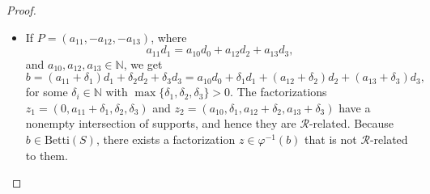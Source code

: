 \documentclass[12pt]{article}
\theoremstyle{remark}
\begin{document}
\begin{proof}
\begin{itemize}
   As $\mu_2 < a_{22}$ and $ \mu_3 < a_{33}$, we have $Q =(-\nu_1,\nu_2,\nu_3)$, where
    \begin{equation}\label{betticharacter_eq41}
        - \nu_1d_1 + \nu_2d_2 +  \nu_3d_3   =  \nu_0d_0,
    \end{equation}
    $\nu_0,\nu_2,\nu_3 \in \mathbb{Z}_{>0}$, $\nu_1 \in \mathbb{N}$ (possibly $\nu_1=0$) and $\mu_2 \geq \nu_2$, $\mu_3 \geq \nu_3$.  We can write 
    \begin{equation}\label{betticharacter_eq42}
        b =  \nu_0d_0 + \nu_1d_1 + (\mu_2-\nu_2)d_2 + (\mu_3-\nu_3)d_3.
    \end{equation}
    We have $\max \{\mu_2-\nu_2,\mu_3-\nu_3 \}>0$, as $b \notin U$, hence $z \, \mathcal{R} \, (\nu_0,\nu_1,\mu_2-\nu_2,\mu_3-\nu_3) \, \mathcal{R}  \, z_1$, which is a contradiction. 
    

    

    
    
   
    Next, suppose that $z = (0,0,\mu_2,0)$. 
    If $\mu_2 = a_{22} $, we would have $b = a_{22}d_2 \in U$, so $\mu_2 > a_{22}$. We can write
    \begin{equation}\label{betticharacter_eq6}
         b=\mu_2d_2 = a_{20}d_0 + a_{21}d_1 + (\mu_2-a_{22})d_2 + a_{23}d_3.
    \end{equation}
    Because $(\mu_2-a_{22}) > 0$, we have $z \, \mathcal{R} \, (a_{20},a_{21},\mu_2-a_{22},a_{23})$. Since $z$ is not $\mathcal{R}$-related to $z_1$, we have $a_{20} = a_{21} = 0$ (recall $a_{00},\delta_1 >0$). This gives the factorization $(0,0,\mu_2-a_{22},a_{23}) \in \varphi^{-1}(b)$ that has $(\mu_2-a_{22}),a_{23} > 0$ and which is not $\mathcal{R}$-related to $z_1$ nor $z_2$, as it is $\mathcal{R}$-related to $z$. Thus, we can proceed as in the case $z =(0,0,\mu_2,\mu_3)$. 

    The case $z = (0,0,0,\mu_3)$ follows analogously. 
    

    \item   If $P =(a_{11},-a_{12},-a_{13})$, where
    \begin{equation}
        a_{11}d_1  =  a_{10}d_0 + a_{12}d_2 + a_{13}d_3,
    \end{equation}
     and $a_{10},a_{12},a_{13} \in \mathbb{N}$, we get
    \begin{equation}\label{betticharacter_eq8}
        b = (a_{11}+\delta_1)d_1 +   \delta_2d_2 + \delta_3d_3  =  a_{10}d_0 + \delta_1d_1+ (a_{12}+\delta_2)d_2 + (a_{13}+\delta_3)d_3,
    \end{equation}
    for some $\delta_i \in \mathbb{N}$ with $\max \{\delta_1,\delta_2,\delta_3\} > 0$. The factorizations $z_1 =(0,a_{11} +\delta_1,\delta_2,\delta_3)$ and $z_2 =(a_{10},\delta_1,a_{12}+\delta_2,a_{13}+\delta_3)$ have a nonempty intersection of supports, and hence they are $\mathcal{R}$-related. Because $b \in \text{Betti}(S)$, there exists a factorization $z \in \varphi^{-1}(b)$ that is not $\mathcal{R}$-related to them. 
    

\end{itemize}
\end{proof}
\end{document}
